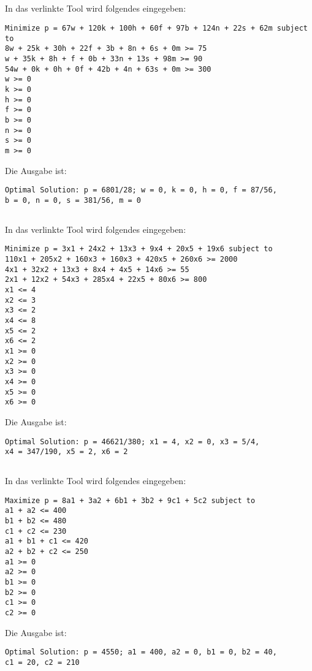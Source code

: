 \documentclass[10pt,a4paper,oneside,ngerman,numbers=noenddot]{scrartcl}
\begin{document}
	\subsection{} %
		In das verlinkte Tool wird folgendes eingegeben:
\begin{verbatim}
Minimize p = 67w + 120k + 100h + 60f + 97b + 124n + 22s + 62m subject to
8w + 25k + 30h + 22f + 3b + 8n + 6s + 0m >= 75
w + 35k + 8h + f + 0b + 33n + 13s + 98m >= 90
54w + 0k + 0h + 0f + 42b + 4n + 63s + 0m >= 300
w >= 0
k >= 0
h >= 0
f >= 0
b >= 0
n >= 0
s >= 0
m >= 0
\end{verbatim}
		Die Ausgabe ist:
\begin{verbatim}
Optimal Solution: p = 6801/28; w = 0, k = 0, h = 0, f = 87/56, 
b = 0, n = 0, s = 381/56, m = 0
\end{verbatim}
	\subsection{} %
		In das verlinkte Tool wird folgendes eingegeben:
\begin{verbatim}
Minimize p = 3x1 + 24x2 + 13x3 + 9x4 + 20x5 + 19x6 subject to
110x1 + 205x2 + 160x3 + 160x3 + 420x5 + 260x6 >= 2000
4x1 + 32x2 + 13x3 + 8x4 + 4x5 + 14x6 >= 55
2x1 + 12x2 + 54x3 + 285x4 + 22x5 + 80x6 >= 800
x1 <= 4
x2 <= 3
x3 <= 2
x4 <= 8
x5 <= 2
x6 <= 2
x1 >= 0
x2 >= 0
x3 >= 0
x4 >= 0
x5 >= 0
x6 >= 0
\end{verbatim}
		Die Ausgabe ist: 
\begin{verbatim}
Optimal Solution: p = 46621/380; x1 = 4, x2 = 0, x3 = 5/4, 
x4 = 347/190, x5 = 2, x6 = 2
\end{verbatim}
	\subsection{} %
		In das verlinkte Tool wird folgendes eingegeben:
\begin{verbatim}
Maximize p = 8a1 + 3a2 + 6b1 + 3b2 + 9c1 + 5c2 subject to
a1 + a2 <= 400
b1 + b2 <= 480
c1 + c2 <= 230
a1 + b1 + c1 <= 420
a2 + b2 + c2 <= 250
a1 >= 0
a2 >= 0
b1 >= 0
b2 >= 0
c1 >= 0
c2 >= 0
\end{verbatim}
	Die Ausgabe ist:
\begin{verbatim}
Optimal Solution: p = 4550; a1 = 400, a2 = 0, b1 = 0, b2 = 40, 
c1 = 20, c2 = 210
\end{verbatim}
\end{document}
